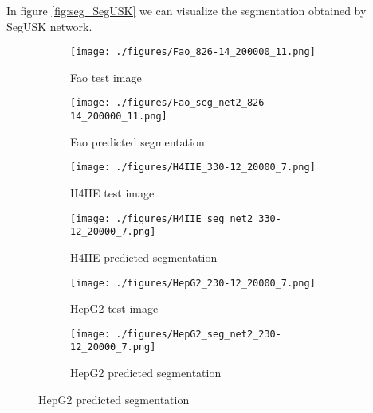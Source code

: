 In figure \ref{fig:seg_SegUSK} we can visualize the segmentation obtained by SegUSK network.
\begin{figure}[ht!]
    \begin{subfigure}{.5\textwidth}
         \centering
        \texttt{[image: ./figures/Fao\_826-14\_200000\_11.png]}
        \caption{Fao test image}
        \label{fig:fao_raw}
    \end{subfigure}
  \begin{subfigure}{.5\textwidth}
        \centering
       \texttt{[image: ./figures/Fao\_seg\_net2\_826-14\_200000\_11.png]}
        \caption{Fao predicted segmentation}
        \label{fig:healthy_raw}
    \end{subfigure}
    
    
     \begin{subfigure}{.5\textwidth}
         \centering
        \texttt{[image: ./figures/H4IIE\_330-12\_20000\_7.png]}
        \caption{H4IIE test image}
        \label{fig:fao_raw}
    \end{subfigure}
  \begin{subfigure}{.5\textwidth}
        \centering
       \texttt{[image: ./figures/H4IIE\_seg\_net2\_330-12\_20000\_7.png]}
        \caption{H4IIE predicted segmentation}
        \label{fig:healthy_raw}
    \end{subfigure}
    
    
     \begin{subfigure}{.5\textwidth}
         \centering
        \texttt{[image: ./figures/HepG2\_230-12\_20000\_7.png]}
        \caption{HepG2 test image}
      \label{fig:hepg2_test}
    \end{subfigure}
  \begin{subfigure}{.5\textwidth}
        \centering
       \texttt{[image: ./figures/HepG2\_seg\_net2\_230-12\_20000\_7.png]}
        \caption{HepG2 predicted segmentation}
       \end{subfigure}
    \end{figure}
